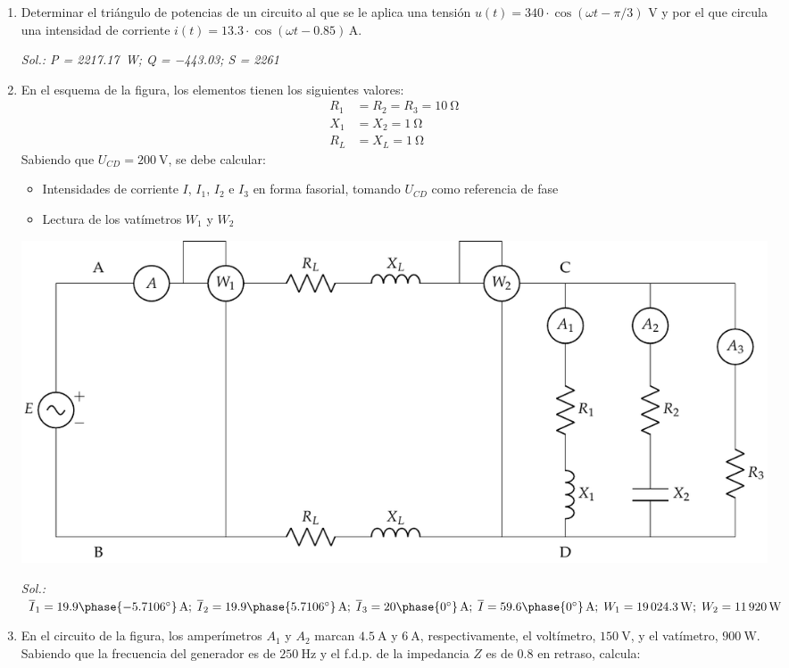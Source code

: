 \begin{enumerate}
\item Determinar el triángulo de potencias de un circuito al que se le
aplica una tensión $u(t)=340 \cdot \cos(\omega t - \pi/3)$ V y
por el que circula una intensidad de corriente
$i(t)= 13.3 \cdot \cos(\omega t-0.85)\,\si{\ampere}$.
  
  \emph{Sol.:\;  P =
    \qty{2217.17}{\watt};\; Q = \qty{-443.03}{\var};\; S =
    \qty{2261}{\voltampere} }

\item En el esquema de la figura, los elementos tienen los siguientes valores:
    \begin{align*}
      R_1 &= R_2 = R_3 = \qty{10}{\ohm}\\
      X_1 &= X_2 = \qty{1}{\ohm}\\
      R_L &= X_L = \qty{1}{\ohm}
    \end{align*}
  Sabiendo que $U_{CD} = \qty{200}{\volt}$, se debe calcular:
    \begin{itemize}
    \item Intensidades de corriente $I$, $I_1$, $I_2$ e $I_3$ {en forma
        fasorial}, tomando $U_{CD}$ como referencia de fase
    \item Lectura de los vatímetros $W_1$ y $W_2$
    \end{itemize}
  \begin{center}
    \includegraphics[width=\linewidth]{../figs/ej8_BT2.pdf}
  \end{center}

  \emph{Sol.:\;
    $\overline{I}_1=19.9\phase{-5.7106^\circ}\,\si{\ampere};\;
    \overline{I}_2=19.9\phase{5.7106^\circ}\,\si{\ampere};\;
    \overline{I}_3=20\phase{\ang{0}}\,\si{\ampere};\;\overline{I}=59.6\phase{\ang{0}}\,\si{\ampere};\;W_1=\qty{19024.3}{\watt};\;
    W_2=\qty{11920}{\watt}$}

\item En el circuito de la figura, los amperímetros $A_1$ y $A_2$ marcan $\qty{4.5}{\ampere}$ y $\qty{6}{\ampere}$, respectivamente, el voltímetro, $\qty{150}{\volt}$, y el vatímetro, $\qty{900}{\watt}$. Sabiendo que la frecuencia del generador es de $\qty{250}{\hertz}$ y el f.d.p. de la impedancia $Z$ es de $0.8$ en retraso, calcula:


\end{enumerate}
